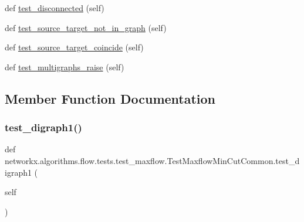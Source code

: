 \begin{DoxyCompactItemize}
\item 
def \hyperlink{classnetworkx_1_1algorithms_1_1flow_1_1tests_1_1test__maxflow_1_1TestMaxflowMinCutCommon_ac843022cd78ab117a5555ffb84a95b84}{test\+\_\+disconnected} (self)
\item 
def \hyperlink{classnetworkx_1_1algorithms_1_1flow_1_1tests_1_1test__maxflow_1_1TestMaxflowMinCutCommon_a7dfebddd138c8b15363c9727a3e1a603}{test\+\_\+source\+\_\+target\+\_\+not\+\_\+in\+\_\+graph} (self)
\item 
def \hyperlink{classnetworkx_1_1algorithms_1_1flow_1_1tests_1_1test__maxflow_1_1TestMaxflowMinCutCommon_a77b2c4b71138378acd3cc1a3d8c96b2f}{test\+\_\+source\+\_\+target\+\_\+coincide} (self)
\item 
def \hyperlink{classnetworkx_1_1algorithms_1_1flow_1_1tests_1_1test__maxflow_1_1TestMaxflowMinCutCommon_a4b4d2061cae3865c2d4da3e9386f02fc}{test\+\_\+multigraphs\+\_\+raise} (self)
\end{DoxyCompactItemize}


\subsection{Member Function Documentation}
\mbox{\label{classnetworkx_1_1algorithms_1_1flow_1_1tests_1_1test__maxflow_1_1TestMaxflowMinCutCommon_a12b436dc2e66f1d675a0b0ed310bca89}} 
\subsubsection{\texorpdfstring{test\+\_\+digraph1()}{test\_digraph1()}}
{\footnotesize\ttfamily def networkx.\+algorithms.\+flow.\+tests.\+test\+\_\+maxflow.\+Test\+Maxflow\+Min\+Cut\+Common.\+test\+\_\+digraph1 (\begin{DoxyParamCaption}\item[{}]{self }\end{DoxyParamCaption})}

